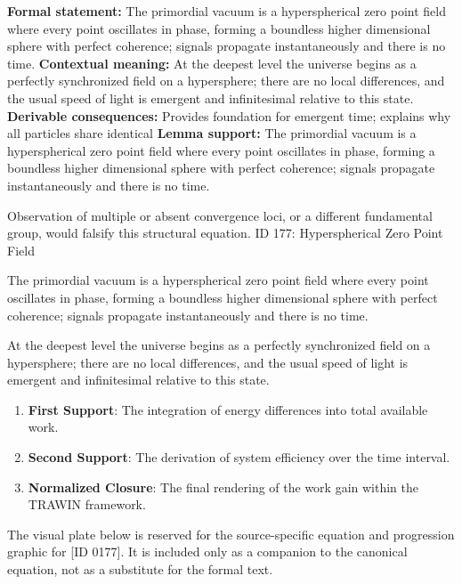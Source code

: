 \begingroup\footnotesize\setlength{\emergencystretch}{3em}\sloppy
\textbf{Formal statement:} The primordial vacuum is a hyperspherical zero point field where every point oscillates in phase, forming a boundless higher dimensional sphere with perfect coherence; signals propagate instantaneously and there is no time.  
\textbf{Contextual meaning:} At the deepest level the universe begins as a perfectly synchronized field on a hypersphere; there are no local differences, and the usual speed of light is emergent and infinitesimal relative to this state.  
\textbf{Derivable consequences:} Provides foundation for emergent time; explains why all particles share identical
\textbf{Lemma support:} The primordial vacuum is a hyperspherical zero point field where every point oscillates in phase, forming a boundless higher dimensional sphere with perfect coherence; signals propagate instantaneously and there is no time.  \par
\endgroup

Observation of multiple or absent convergence loci, or a different fundamental group, would falsify this structural equation. ID 177: Hyperspherical Zero Point Field

The primordial vacuum is a hyperspherical zero point field where every point oscillates in phase, forming a boundless higher dimensional sphere with perfect coherence; signals propagate instantaneously and there is no time.  

At the deepest level the universe begins as a perfectly synchronized field on a hypersphere; there are no local differences, and the usual speed of light is emergent and infinitesimal relative to this state.  
\endgroup

\begin{enumerate}[leftmargin=1.6em,itemsep=6pt,topsep=4pt]
\item \textbf{First Support}: The integration of energy differences into total available work.
\item \textbf{Second Support}: The derivation of system efficiency over the time interval.
\item \textbf{Normalized Closure}: The final rendering of the work gain within the TRAWIN framework.
\end{enumerate}

\begingroup\footnotesize\sloppy
The visual plate below is reserved for the source-specific equation and progression graphic for [ID 0177]. It is included only as a companion to the canonical equation, not as a substitute for the formal text.
\par\endgroup
\ifTZPDarkEdition
{}
\fi

